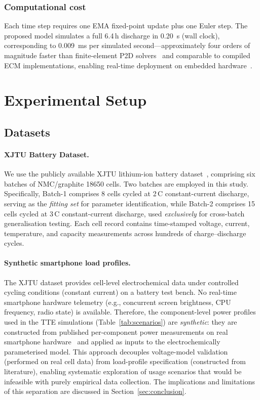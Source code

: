 \documentclass[5p,times,number]{elsarticle}
\newcommand{\tabref}[1]{\textcolor{supercolor}{Table~\ref{#1}}}
\newcommand{\secref}[1]{\textcolor{supercolor}{Section~\ref{#1}}}
\begin{document}
\subsubsection{Computational cost}\label{sec:comp_cost}
Each time step requires one EMA fixed-point update plus one Euler step.
The proposed model simulates a full 6.4\,h discharge in \SI{0.20}{\second} (wall clock), corresponding to \SI{0.009}{\milli\second} per simulated second---approximately four orders of magnitude faster than finite-element P2D solvers~\cite{Doyle1993,Newman2004,Mama2025} and comparable to compiled ECM implementations, enabling real-time deployment on embedded hardware~\cite{Xiong2018,Wang2020RSER}.

\section{Experimental Setup}\label{sec:experiments}
\subsection{Datasets}\label{sec:datasets}
\paragraph{XJTU Battery Dataset.}
We use the publicly available XJTU lithium-ion battery dataset~\cite{XJTU2020}, comprising six batches of NMC/graphite 18650 cells.
Two batches are employed in this study.
Specifically, Batch-1 comprises 8 cells cycled at 2\,C constant-current discharge, serving as the \emph{fitting set} for parameter identification, while Batch-2 comprises 15 cells cycled at 3\,C constant-current discharge, used \emph{exclusively} for cross-batch generalisation testing.
Each cell record contains time-stamped voltage, current, temperature, and capacity measurements across hundreds of charge--discharge cycles.

\paragraph{Synthetic smartphone load profiles.}
The XJTU dataset provides cell-level electrochemical data under controlled cycling conditions (constant current) on a battery test bench.
No real-time smartphone hardware telemetry (e.g., concurrent screen brightness, CPU frequency, radio state) is available.
Therefore, the component-level power profiles used in the TTE simulations (\tabref{tab:scenarios}) are \emph{synthetic}: they are constructed from published per-component power measurements on real smartphone hardware~\cite{Carroll2010,Chen2014,Lu2008,Murmuria2012} and applied as inputs to the electrochemically parameterised model.
This approach decouples voltage-model validation (performed on real cell data) from load-profile specification (constructed from literature), enabling systematic exploration of usage scenarios that would be infeasible with purely empirical data collection.
The implications and limitations of this separation are discussed in \secref{sec:conclusion}.
\end{document}
